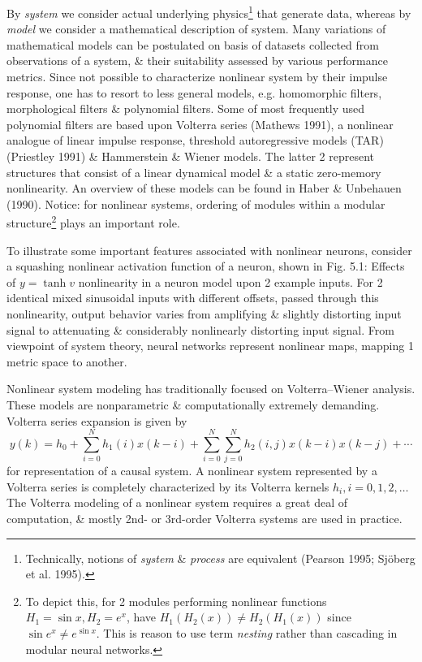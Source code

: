 \documentclass{article}
\begin{document}
\begin{enumerate}
\begin{itemize}
\begin{itemize}
			By {\it system} we consider actual underlying physics\footnote{Technically, notions of {\it system} \& {\it process} are equivalent (Pearson 1995; Sjöberg et al. 1995).} that generate data, whereas by {\it model} we consider a mathematical description of system. Many variations of mathematical models can be postulated on basis of datasets collected from observations of a system, \& their suitability assessed by various performance metrics. Since not possible to characterize nonlinear system by their impulse response, one has to resort to less general models, e.g. homomorphic filters, morphological filters \& polynomial filters. Some of most frequently used polynomial filters are based upon Volterra series (Mathews 1991), a nonlinear analogue of linear impulse response, threshold autoregressive models (TAR) (Priestley 1991) \& Hammerstein \& Wiener models. The latter 2 represent structures that consist of a linear dynamical model \& a static zero-memory nonlinearity. An overview of these models can be found in Haber \& Unbehauen (1990). Notice: for nonlinear systems, ordering of modules within a modular structure\footnote{To depict this, for 2 modules performing nonlinear functions $H_1 = \sin x,H_2 = e^x$, have $H_1(H_2(x))\ne H_2(H_1(x))$ since $\sin e^x\ne e^{\sin x}$. This is reason to use term {\it nesting} rather than cascading in modular neural networks.} plays an important role.
			
			To illustrate some important features associated with nonlinear neurons, consider a squashing nonlinear activation function of a neuron, shown in {\sf Fig. 5.1: Effects of $y = \tanh v$ nonlinearity in a neuron model upon 2 example inputs}. For 2 identical mixed sinusoidal inputs with different offsets, passed through this nonlinearity, output behavior varies from amplifying \& slightly distorting input signal to attenuating \& considerably nonlinearly distorting input signal. From viewpoint of system theory, neural networks represent nonlinear maps, mapping 1 metric space to another.
			
			Nonlinear system modeling has traditionally focused on Volterra--Wiener analysis. These models are nonparametric \& computationally extremely demanding. Volterra series expansion is given by
			\begin{equation}
				y(k) = h_0 + \sum_{i=0}^N h_1(i)x(k - i) + \sum_{i=0}^N\sum_{j=0}^N h_2(i,j)x(k - i)x(k - j) + \cdots
			\end{equation}
			for representation of a causal system. A nonlinear system represented by a Volterra series is completely characterized by its Volterra kernels $h_i,i = 0,1,2,\ldots$ The Volterra modeling of a nonlinear system requires a great deal of computation, \& mostly 2nd- or 3rd-order Volterra systems are used in practice.
			

\end{itemize}
\end{itemize}
\end{enumerate}
\end{document}
